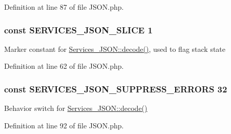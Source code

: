 Definition at line 87 of file J\+S\+O\+N.\+php.

\hypertarget{_j_s_o_n_8php_a1e79ff1fd74e07c4ccdcd0b80e43ea04}{
\subsubsection[{S\+E\+R\+V\+I\+C\+E\+S\+\_\+\+J\+S\+O\+N\+\_\+\+S\+L\+I\+C\+E}]{\setlength{\rightskip}{0pt plus 5cm}const S\+E\+R\+V\+I\+C\+E\+S\+\_\+\+J\+S\+O\+N\+\_\+\+S\+L\+I\+C\+E 1}}\label{_j_s_o_n_8php_a1e79ff1fd74e07c4ccdcd0b80e43ea04}
Marker constant for \hyperlink{class_services___j_s_o_n_a4afbb486f4a5ff5a8170c832f5997986}{Services\+\_\+\+J\+S\+O\+N\+::decode()}, used to flag stack state 

Definition at line 62 of file J\+S\+O\+N.\+php.

\hypertarget{_j_s_o_n_8php_ae614918331d7f14a4da9de624af7df33}{
\subsubsection[{S\+E\+R\+V\+I\+C\+E\+S\+\_\+\+J\+S\+O\+N\+\_\+\+S\+U\+P\+P\+R\+E\+S\+S\+\_\+\+E\+R\+R\+O\+R\+S}]{\setlength{\rightskip}{0pt plus 5cm}const S\+E\+R\+V\+I\+C\+E\+S\+\_\+\+J\+S\+O\+N\+\_\+\+S\+U\+P\+P\+R\+E\+S\+S\+\_\+\+E\+R\+R\+O\+R\+S 32}}\label{_j_s_o_n_8php_ae614918331d7f14a4da9de624af7df33}
Behavior switch for \hyperlink{class_services___j_s_o_n_a4afbb486f4a5ff5a8170c832f5997986}{Services\+\_\+\+J\+S\+O\+N\+::decode()} 

Definition at line 92 of file J\+S\+O\+N.\+php.

